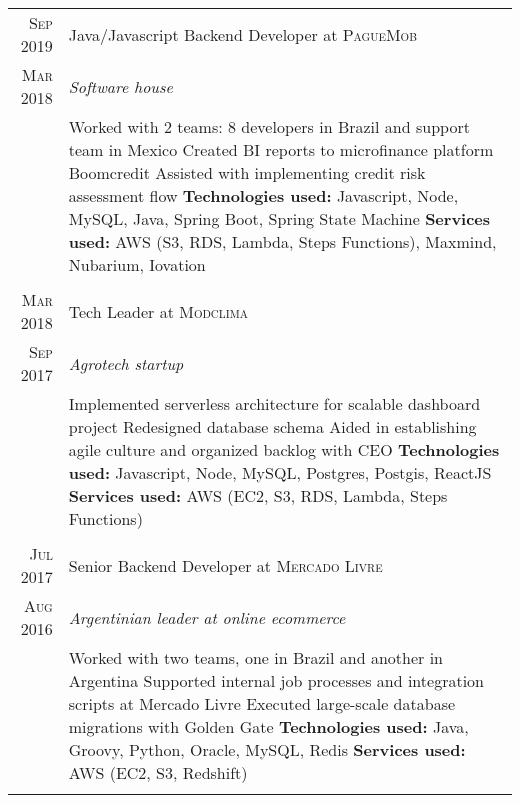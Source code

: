 \documentclass[a4paper,10pt]{article}
\begin{document}
\begin{tabular}{r|p{11cm}}
 \textsc{ Sep 2019 } & Java/Javascript Backend Developer at \textsc{PagueMob} \\\textsc{Mar 2018}&\emph{Software house }\\&\footnotesize{
  Worked with 2 teams: 8 developers in Brazil and support team in Mexico \newline
  Created BI reports to microfinance platform Boomcredit \newline
  Assisted with implementing credit risk assessment flow \newline
\textbf{Technologies used:} Javascript, Node, MySQL, Java, Spring Boot, Spring State Machine\newline
\textbf{Services used:} AWS (S3, RDS, Lambda, Steps Functions), Maxmind, Nubarium, Iovation }\\\multicolumn{2}{c}{} \\

 \textsc{ Mar 2018 } & Tech Leader at \textsc{Modclima} \\\textsc{Sep 2017}&\emph{Agrotech startup }\\&\footnotesize{
  Implemented serverless architecture for scalable dashboard project\newline
  Redesigned database schema\newline
  Aided in establishing agile culture and organized backlog with CEO\newline
\textbf{Technologies used:} Javascript, Node, MySQL, Postgres, Postgis, ReactJS\newline
\textbf{Services used:} AWS (EC2, S3, RDS, Lambda, Steps Functions)}\\\multicolumn{2}{c}{} \\

 \textsc{Jul 2017} & Senior Backend Developer at \textsc{Mercado Livre} \\\textsc{Aug 2016}&\emph{Argentinian leader at online ecommerce }\\&\footnotesize{
  Worked with two teams, one in Brazil and another in Argentina\newline
  Supported internal job processes and integration scripts at Mercado Livre\newline
  Executed large-scale database migrations with Golden Gate\newline
\textbf{Technologies used:} Java, Groovy, Python, Oracle, MySQL, Redis\newline
\textbf{Services used:} AWS (EC2, S3, Redshift)}\\\multicolumn{2}{c}{} \\
 
 \end{tabular}
 
\end{document}
